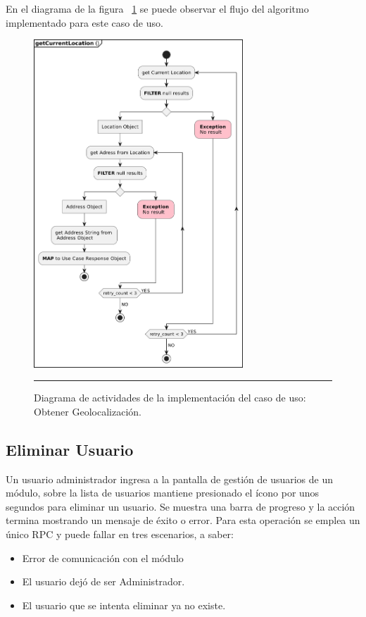 En el diagrama de la figura ~\ref{fig:act_geoloc} se puede observar el flujo del algoritmo implementado para este caso de uso.

\begin{figure}[htbp]
	\centering
	\includegraphics[width=0.7\textwidth]{Figures/iter2/ACT_geoloc.png}
	\rule{35em}{1pt}
	\caption[Actividades Obtener Geolocalización]{Diagrama de actividades de la implementación del caso de uso: Obtener Geolocalización.}
	\label{fig:act_geoloc}
\end{figure}

\subsection{Eliminar Usuario}
Un usuario administrador ingresa a la pantalla de gestión de usuarios de un módulo, sobre la lista de usuarios mantiene presionado el ícono por unos segundos para eliminar un usuario. Se muestra una barra de progreso y la acción termina mostrando un mensaje de éxito o error.
Para esta operación se emplea un único RPC y puede fallar en tres escenarios, a saber:
\begin{itemize}
	\item Error de comunicación con el módulo
	\item El usuario dejó de ser Administrador.
	\item El usuario que se intenta eliminar ya no existe.
\end{itemize}

